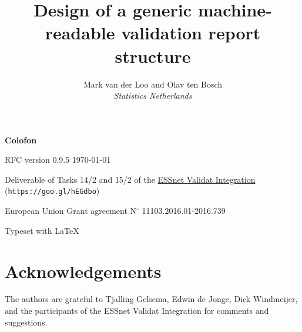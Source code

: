 \documentclass[a4paper, 11pt,titlepage]{article}
\title{Design of a generic machine-readable validation report structure}
\author{Mark van der Loo and Olav ten Bosch\\
\emph{Statistics Netherlands}
}
\date{\version{}\\
\begin{picture}(0,0)
\put(150,350){\texttt{[image: fig/logo\_validat\_integration.png]}}
\end{picture}
}
\newcommand{\version}{RFC version 0.9.5 \today}
\begin{document}
\maketitle{}

\thispagestyle{empty}
\null
\vfill{}
\begin{description}[noitemsep]
\item \textbf{Colofon}
\item \version{}
\item Deliverable of Tasks 14/2 and 15/2 of the \href{https://ec.europa.eu/eurostat/cros/content/essnet-validat-integration_en}{ESSnet Validat Integration} (\texttt{https://goo.gl/hEGdbo})
\item European Union Grant agreement N$^\circ$ 11103.2016.01-2016.739
\item Typeset with \LaTeX
\end{description}

\newpage

\tableofcontents{}

\newpage














\clearpage{}


\clearpage{}



\clearpage{}
\section*{Acknowledgements}
The authors are grateful to Tjalling Gelsema, Edwin de Jonge, Dick Windmeijer,
and the participants of the ESSnet Validat Integration for comments and suggestions.

\clearpage{}

\end{document}

